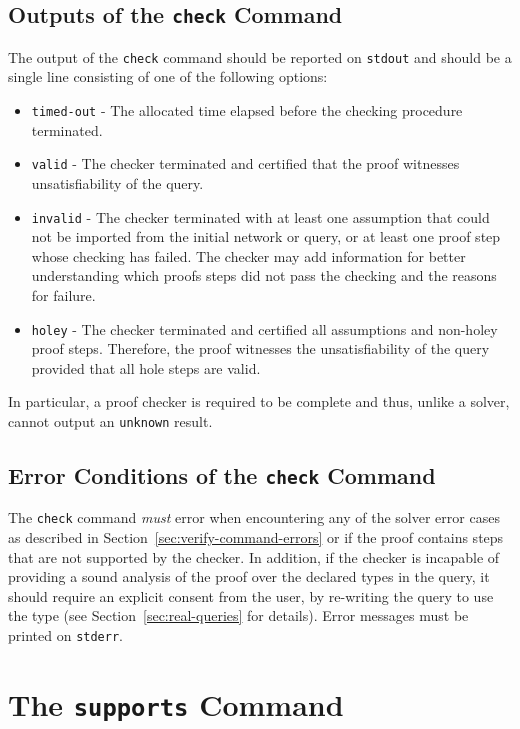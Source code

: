 \subsection{Outputs of the \texttt{check} Command}
 The output of the \texttt{check} command should be reported on \texttt{stdout} and should be a single line consisting of one of the following options:
\begin{itemize}
	\item \texttt{timed-out} - The allocated time elapsed before the checking procedure terminated.
	\item \texttt{valid} - The checker terminated and certified that the proof witnesses unsatisfiability of the query.
	\item \texttt{invalid} - The checker terminated with at least one assumption that could not be imported from the initial network or \vnnlib{} query, or at least one proof step whose checking has failed. The checker may add information for better understanding which proofs steps did not pass the checking and the reasons for failure.
	\item \texttt{holey} - The checker terminated and certified all assumptions and non-holey proof steps. Therefore, the proof witnesses the unsatisfiability of the query provided that all hole steps are valid.
\end{itemize}
In particular, a proof checker is required to be complete and thus, unlike a solver, cannot output an \texttt{unknown} result.

\subsection{Error Conditions of the \texttt{check} Command}
The \texttt{check} command \emph{must} error when encountering any of the solver error cases as described in Section~\ref{sec:verify-command-errors} or if the proof contains steps that are not supported by the checker. In addition, if the checker is incapable of providing a sound analysis of the proof over the declared types in the \vnnlib{} query, it should require an explicit consent from the user, by re-writing the query to use the  type (see Section~\ref{sec:real-queries} for details). Error messages must be printed on \texttt{stderr}.



\section{The \texttt{supports} Command}

